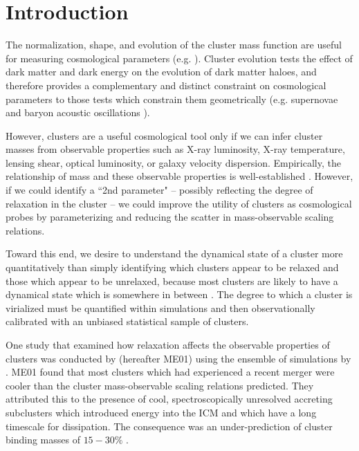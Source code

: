 \documentclass{emulateapj}
\begin{document}


\section{Introduction}\label{sec:intro}

The normalization, shape, and evolution of the cluster mass function
are useful for measuring cosmological parameters
(e.g. \citealt{1989ApJ...341L..71E, 1998ApJ...508..483W,
2001ApJ...553..545H,  2004PhRvD..70l3008W}). Cluster evolution tests
the effect of dark matter and dark energy on the evolution of dark
matter haloes, and therefore provides a complementary and distinct
constraint on cosmological parameters to those tests which constrain
them geometrically (e.g. supernovae \citealt{1998AJ....116.1009R,
2007ApJ...659...98R} and baryon acoustic oscillations
\citealt{2005ApJ...633..560E}).

However, clusters are a useful cosmological tool only if we can infer
cluster masses from observable properties such as X-ray luminosity,
X-ray temperature, lensing shear, optical luminosity, or galaxy
velocity dispersion. Empirically, the relationship of mass and these
observable properties is well-established
\citep{2005RvMP...77..207V}. However, if we could identify a ``2nd
parameter" -- possibly reflecting the degree of relaxation in the
cluster -- we could improve the utility of clusters as cosmological
probes by parameterizing and reducing the scatter in mass-observable
scaling relations.

Toward this end, we desire to understand the dynamical state of a
cluster more quantitatively than simply identifying which clusters
appear to be relaxed and those which appear to be unrelaxed, because
most clusters are likely to have a dynamical state which is somewhere
in between \citep{2006ApJ...639...64O, 2006ApJ...650..128K}. The
degree to which a cluster is virialized must be quantified within
simulations and then observationally calibrated with an unbiased
statistical sample of clusters.

One study that examined how relaxation affects the observable
properties of clusters was conducted by \citealt{2001ApJ...546..100M}
(hereafter ME01) using the ensemble of simulations by
\citealt{1997ApJ...491...38M}. ME01 found that most clusters which had
experienced a recent merger were cooler than the cluster
mass-observable scaling relations predicted. They attributed this to the
presence of cool, spectroscopically unresolved accreting subclusters
which introduced energy into the ICM and which have a long timescale for
dissipation. The consequence was an under-prediction of cluster
binding masses of $15-30\%$ \citep{2001ApJ...546..100M}.
\end{document}
